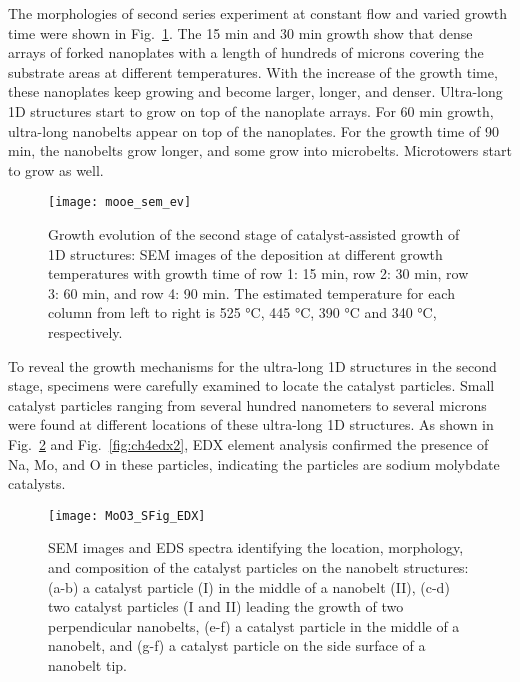 The morphologies of second series experiment at constant  flow and varied growth time were shown in Fig.~\ref{fig:ch4ev}. The 15 min and 30 min growth show that dense arrays of  forked nanoplates with a length of hundreds of microns covering the substrate areas at different temperatures. With the increase of the growth time, these nanoplates keep growing and become larger, longer, and denser. Ultra-long 1D  structures start to grow on top of the nanoplate arrays. For 60 min growth, ultra-long nanobelts appear on top of the nanoplates. For the growth time of 90 min, the nanobelts grow longer, and some grow into microbelts. Microtowers start to grow as well.

\begin{figure}[htb]
\centering
\texttt{[image: mooe\_sem\_ev]}
\caption[Growth evolution of : second stage]{Growth evolution of the second stage of catalyst-assisted growth of  1D structures: SEM images of the deposition at different growth temperatures with growth time of row 1: 15 min, row 2: 30 min, row 3: 60 min, and row 4: 90 min. The estimated temperature for each column from left to right is 525 \si{\degreeCelsius}, 445 \si{\degreeCelsius}, 390 \si{\degreeCelsius} and 340 \si{\degreeCelsius}, respectively. }
\label{fig:ch4ev}
\end{figure}


To reveal the growth mechanisms for the ultra-long 1D structures in the second stage, specimens were carefully examined to locate the catalyst particles. Small catalyst particles ranging from several hundred nanometers to several microns were found at different locations of these ultra-long 1D structures. As shown in Fig.~\ref{fig:ch4edx1} and Fig.~\ref{fig:ch4edx2}, EDX element analysis confirmed the presence of Na, Mo, and O in these particles, indicating the particles are sodium molybdate catalysts.  

\begin{figure}[htb]
\centering
\texttt{[image: MoO3\_SFig\_EDX]}
\caption[Growth evolution of : second stage]{SEM images and EDS spectra identifying the location, morphology, and composition of the catalyst particles on the nanobelt structures: (a-b) a catalyst particle (I) in the middle of a nanobelt (II), (c-d) two catalyst particles (I and II) leading the growth of two perpendicular nanobelts, (e-f) a catalyst particle in the middle of a nanobelt, and (g-f) a catalyst particle on the side surface of a nanobelt tip. }
\label{fig:ch4edx1}
\end{figure}


